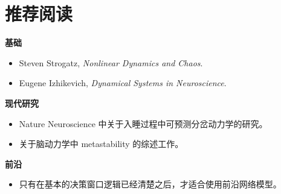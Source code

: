 \section{推荐阅读}

\begin{readingbox}
\textbf{基础}
\begin{itemize}[nosep]
  \item Steven Strogatz, \emph{Nonlinear Dynamics and Chaos}.
  \item Eugene Izhikevich, \emph{Dynamical Systems in Neuroscience}.
\end{itemize}
\textbf{现代研究}
\begin{itemize}[nosep]
  \item Nature Neuroscience 中关于入睡过程中可预测分岔动力学的研究。
  \item 关于脑动力学中 metastability 的综述工作。
\end{itemize}
\textbf{前沿}
\begin{itemize}[nosep]
  \item 只有在基本的决策窗口逻辑已经清楚之后，才适合使用前沿网络模型。
\end{itemize}
\end{readingbox}